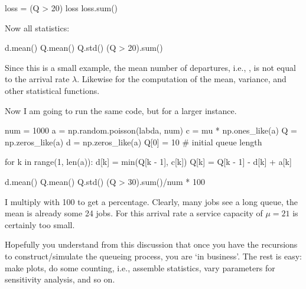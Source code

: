 \begin{exercise}
\begin{solution}
\begin{pyconsole}
loss = (Q > 20)
loss
loss.sum()
\end{pyconsole}

Now all statistics:

\begin{pyconsole}
d.mean()
Q.mean()
Q.std()
(Q > 20).sum()
\end{pyconsole}
  

Since this is a small example, the mean number of departures, i.e.,
, is not equal to the arrival rate $\lambda$.  
Likewise for the computation of the mean, variance, and other
statistical functions. 

Now I am going to run the same code, but for a larger instance. 

\begin{pyconsole}
num = 1000
a = np.random.poisson(labda, num)
c = mu * np.ones_like(a)
Q = np.zeros_like(a)
d = np.zeros_like(a)
Q[0] = 10  # initial queue length

for k in range(1, len(a)):
    d[k] = min(Q[k - 1], c[k])
    Q[k] = Q[k - 1] - d[k] + a[k]

d.mean()
Q.mean()
Q.std()
(Q > 30).sum()/num * 100
\end{pyconsole}


I multiply with 100 to get a percentage. Clearly, many jobs see a long
queue, the mean is already some 24 jobs. For this arrival rate a
service capacity of $\mu=21$ is certainly too small. 


Hopefully you
understand from this discussion that once you have the recursions to
construct/simulate the queueing process, you are `in business'. The
rest is easy: make plots, do some counting, i.e., assemble statistics,
vary parameters for sensitivity analysis, and so on.


\end{solution}
\end{exercise}


